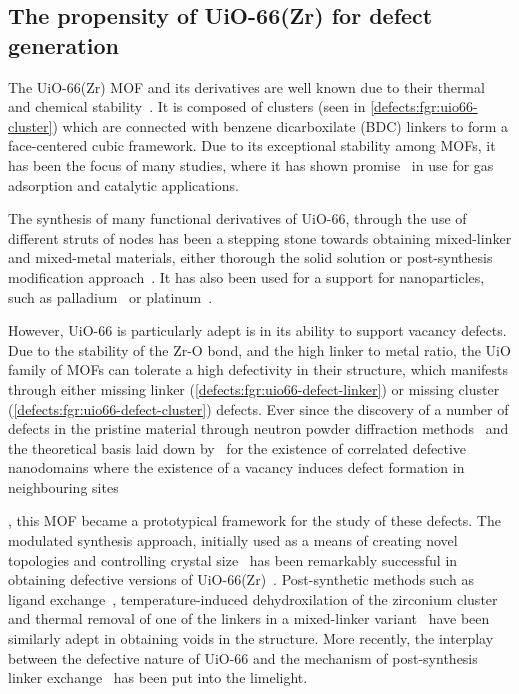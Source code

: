 \subsection{The propensity of UiO-66(Zr) for defect generation}

The UiO-66(Zr) MOF and its derivatives are well known due to
their thermal and chemical stability~\cite{cavkaNewZirconiumInorganic2008}.
It is composed of  clusters
(seen in \autoref{defects:fgr:uio66-cluster}) which are connected
with benzene dicarboxilate (BDC) linkers to form a face-centered cubic
framework. Due to its exceptional stability among MOFs, it has been the
focus of many studies, where it has shown
promise~\cite{wiersumEvaluationUiO66GasBased2011} in use for gas
adsorption and catalytic applications.

The synthesis of many functional derivatives of UiO-66,
through the use of different struts of nodes has been a stepping 
stone towards obtaining mixed-linker and mixed-metal materials, 
either thorough the solid solution or post-synthesis modification
approach~\cite{kimPostsyntheticLigandExchange2012}.
It has also been used for a support for nanoparticles, such
as palladium~\cite{shenHighlyDispersedPalladium2013}
or platinum~\cite{oienProbingReactivePlatinum2015}.

However, UiO-66 is particularly adept is in its ability to support
vacancy defects. Due to the stability of the Zr-O bond, and the
high linker to metal ratio, the UiO family of MOFs can tolerate
a high defectivity in their structure, which manifests through
either missing linker
(\autoref{defects:fgr:uio66-defect-linker}) or missing
cluster (\autoref{defects:fgr:uio66-defect-cluster}) defects.
Ever since the discovery of a number of
defects in the pristine material through neutron powder diffraction
methods~\cite{wuUnusualHighlyTunable2013} and the theoretical
basis laid down by~\citeauthor{cliffeCorrelatedDefectNanoregions2014}
for the existence of correlated defective nanodomains where the
existence of a vacancy induces defect formation in neighbouring
sites~\author{cliffeCorrelatedDefectNanoregions2014}, this MOF
became a prototypical framework for the study of these defects.
The modulated synthesis approach, initially used as
a means of creating novel topologies and controlling crystal
size~\cite{guillermZirconiumMethacrylateOxocluster2010}
has been remarkably successful in obtaining defective versions
of UiO-66(Zr)~\cite{shearerDefectEngineeringTuning2016}.
Post-synthetic methods such as ligand
exchange~\cite{shearerFunctionalizingDefectsPostsynthetic2016},
temperature-induced dehydroxilation of the zirconium
cluster~\cite{valenzanoDisclosingComplexStructure2011} and
thermal removal of one of the linkers in a mixed-linker
variant~\cite{buekenTacklingDefectConundrum2017} have been
similarly adept in obtaining voids in the structure.
More recently, the interplay between the 
defective nature of UiO-66 and the mechanism of 
post-synthesis linker exchange~\cite{taddeiPostsyntheticLigandExchange2018}
has been put into the limelight.


